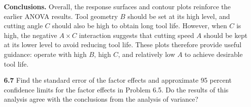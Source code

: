\documentclass[answers,12pt,addpoints]{exam}
\begin{document}
\begin{solution}
\medskip
\textbf{Conclusions.}
Overall, the response surfaces and contour plots reinforce the earlier ANOVA results. Tool geometry $B$ should be set at its high level, and cutting angle $C$ should also be high to obtain long tool life. However, when $C$ is high, the negative $A\times C$ interaction suggests that cutting speed $A$ should be kept at its lower level to avoid reducing tool life. These plots therefore provide useful guidance: operate with high $B$, high $C$, and relatively low $A$ to achieve desirable tool life.

\end{solution}

\textbf{6.7}
Find the standard error of the factor effects and approximate 95 percent confidence limits for the factor effects in Problem 6.5. Do the results of this analysis agree with the conclusions from the analysis of variance?
\end{document}
